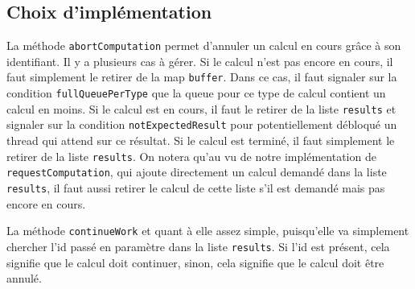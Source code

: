 \documentclass{article}
\begin{document}
\subsection{Choix d'implémentation}
La méthode \texttt{abortComputation} permet d’annuler un calcul en cours grâce à son identifiant. Il y a plusieurs
cas à gérer. Si le calcul n’est pas encore en cours, il faut simplement le retirer de la map \texttt{buffer}. Dans
ce cas, il faut signaler sur la condition \texttt{fullQueuePerType} que la queue pour ce type de calcul contient un
calcul en moins. Si le calcul est en cours, il faut le retirer de la liste \texttt{results} et signaler sur
la condition \texttt{notExpectedResult} pour potentiellement débloqué un thread qui attend sur ce résultat.
Si le calcul est terminé, il faut simplement le retirer de la liste \texttt{results}.
On notera qu'au vu de notre implémentation de \texttt{requestComputation}, qui ajoute directement un calcul demandé
dans la liste \texttt{results}, il faut aussi retirer le calcul de cette liste s'il est demandé mais pas encore en
cours.

La méthode \texttt{continueWork} et quant à elle assez simple, puisqu'elle va simplement chercher l'id passé en
paramètre dans la liste \texttt{results}. Si l'id est présent, cela signifie que le calcul doit continuer, sinon, cela
signifie que le calcul doit être annulé.
\end{document}

